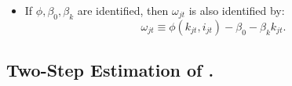 \documentclass[
]{book}
\providecommand{\tightlist}{%
  \setlength{\itemsep}{0pt}\setlength{\parskip}{0pt}}
\begin{document}
\begin{itemize}
\tightlist
\item
  If \(\phi, \beta_0, \beta_k\) are identified, then \(\omega_{jt}\) is also identified by:
  \begin{equation}
  \omega_{jt} \equiv \phi(k_{jt}, i_{jt}) - \beta_0 - \beta_k k_{jt}.
  \end{equation}
\end{itemize}

\hypertarget{two-step-estimation-of-olley1996.}{%
\subsection{\texorpdfstring{Two-Step Estimation of \citet{Olley1996}.}{Two-Step Estimation of @Olley1996.}}\label{two-step-estimation-of-olley1996.}}
\end{document}

